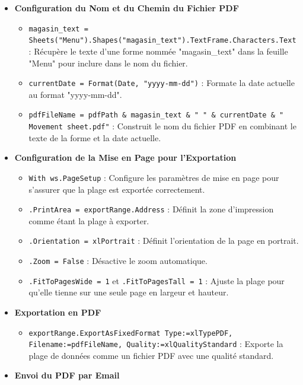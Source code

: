 \documentclass[a4paper, oneside, 12pt, final]{extreport}
\begin{document}
\begin{itemize}
\item\textbf{Configuration du Nom et du Chemin du Fichier PDF}

\begin{itemize}
    \item \texttt{magasin\_text = Sheets("Menu").Shapes("magasin\_text").TextFrame.Characters.Text} : Récupère le texte d'une forme nommée "magasin\_text" dans la feuille "Menu" pour inclure dans le nom du fichier.
    \item \texttt{currentDate = Format(Date, "yyyy-mm-dd")} : Formate la date actuelle au format "yyyy-mm-dd".
    \item \texttt{pdfFileName = pdfPath \& magasin\_text \& " " \& currentDate \& " Movement sheet.pdf"} : Construit le nom du fichier PDF en combinant le texte de la forme et la date actuelle.
\end{itemize}

\item\textbf{Configuration de la Mise en Page pour l'Exportation}

\begin{itemize}
    \item \texttt{With ws.PageSetup} : Configure les paramètres de mise en page pour s'assurer que la plage est exportée correctement.
    \item \texttt{.PrintArea = exportRange.Address} : Définit la zone d'impression comme étant la plage à exporter.
    \item \texttt{.Orientation = xlPortrait} : Définit l'orientation de la page en portrait.
    \item \texttt{.Zoom = False} : Désactive le zoom automatique.
    \item \texttt{.FitToPagesWide = 1} et \texttt{.FitToPagesTall = 1} : Ajuste la plage pour qu'elle tienne sur une seule page en largeur et hauteur.
\end{itemize}

\item\textbf{Exportation en PDF}

\begin{itemize}
    \item \texttt{exportRange.ExportAsFixedFormat Type:=xlTypePDF, Filename:=pdfFileName, Quality:=xlQualityStandard} : Exporte la plage de données comme un fichier PDF avec une qualité standard.
\end{itemize}

\item\textbf{Envoi du PDF par Email}


\end{itemize}
\end{document}

